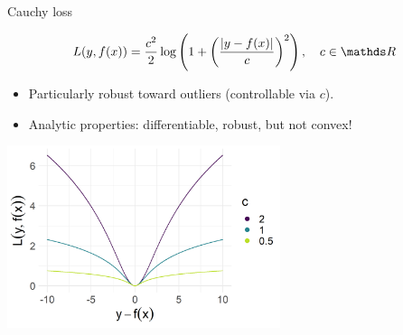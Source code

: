 \begin{vbframe}{Cauchy loss}


$$
\Lxy = \frac{c^2}{2} \log \left( 1 + \left( \frac{\left|y - \fx\right|}{c}\right)^2 \right), 
\quad c \in \R
$$

\normalsize
\begin{itemize}
\item Particularly robust toward outliers (controllable via $c$).
\item Analytic properties: differentiable, robust, but not convex! 
\end{itemize}

\vfill

\begin{center}
\includegraphics[width = 0.6\textwidth]{figure/loss_cauchy.png}
\end{center}

\end{vbframe}


